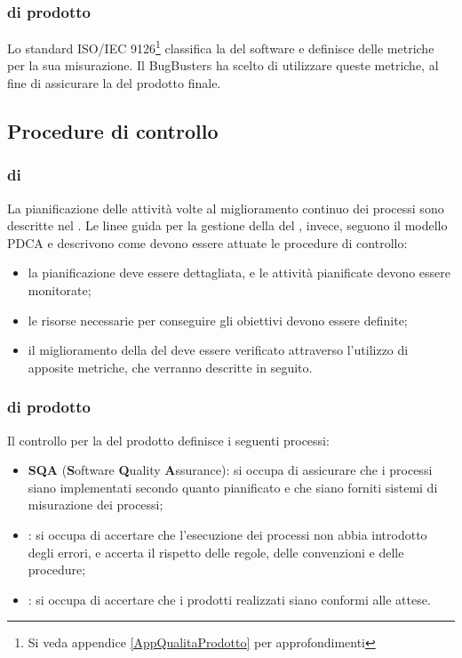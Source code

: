 \subsubsection{ di prodotto}
Lo standard ISO/IEC 9126\footnote{Si veda appendice \ref{AppQualitaProdotto} per approfondimenti} classifica la  del software e definisce delle metriche per la sua misurazione. Il  BugBusters ha scelto di utilizzare queste metriche, al fine di assicurare la  del prodotto finale.

\subsection{Procedure di controllo}
\subsubsection{ di }
La pianificazione delle attività volte al miglioramento continuo dei processi sono descritte nel \PianoDiProgetto. Le linee guida per la gestione della  del , invece, seguono il modello PDCA e descrivono come devono essere attuate le procedure di controllo:
\begin{itemize}
	\item la pianificazione deve essere dettagliata, e le attività pianificate devono essere monitorate;
	\item le risorse necessarie per conseguire gli obiettivi devono essere definite;
	\item il miglioramento della  del  deve essere verificato attraverso l'utilizzo di apposite metriche, che verranno descritte in seguito.
\end{itemize}

\subsubsection{ di prodotto}
Il controllo per la  del prodotto definisce i seguenti processi:
\begin{itemize}
	\item \textbf{SQA} (\textbf{S}oftware \textbf{Q}uality \textbf{A}ssurance): si occupa di assicurare che i processi siano implementati secondo quanto pianificato e che siano forniti sistemi di misurazione dei processi;
	\item \textbf{}: si occupa di accertare che l'esecuzione dei processi non abbia introdotto degli errori, e accerta il rispetto delle regole, delle convenzioni e delle procedure;
	\item \textbf{}: si occupa di accertare che i prodotti realizzati siano conformi alle attese.
\end{itemize}

